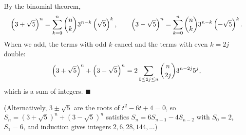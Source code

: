 By the binomial theorem,
\[
\left(3+\sqrt5\right)^n=\sum_{k=0}^{n}\dbinom nk3^{n-k}\left(\sqrt5\right)^k,\qquad\left(3-\sqrt5\right)^n=\sum_{k=0}^{n}\dbinom nk3^{n-k}\left(-\sqrt5\right)^k .
\]
When we add, the terms with odd $k$ cancel and the terms with even $k=2j$ double:
\[
\left(3+\sqrt5\right)^n+\left(3-\sqrt5\right)^n=2\sum_{0\le 2j\le n}\dbinom{n}{2j}3^{n-2j}5^{j},
\]
which is a sum of integers. $\blacksquare$

(Alternatively, $3\pm\sqrt5$ are the roots of $t^2-6t+4=0$, so $S_n=\left(3+\sqrt5\right)^n+\left(3-\sqrt5\right)^n$ satisfies $S_n=6S_{n-1}-4S_{n-2}$ with $S_0=2$, $S_1=6$, and induction gives integers $2,6,28,144,\dots$)
